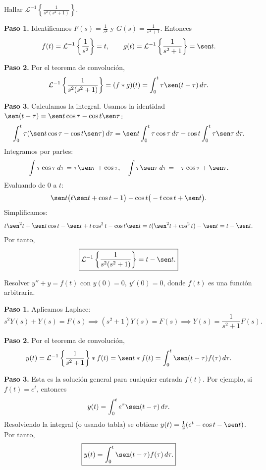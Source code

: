 \begin{example}
Hallar $\mathcal{L}^{-1}\left\{\frac{1}{s^2(s^2+1)}\right\}$.
\begin{myproof}
\textbf{Paso 1.} Identificamos $F(s)=\frac{1}{s^2}$ y $G(s)=\frac{1}{s^2+1}$. Entonces
\[
f(t)=\mathcal{L}^{-1}\left\{\frac{1}{s^2}\right\}=t,\qquad g(t)=\mathcal{L}^{-1}\left\{\frac{1}{s^2+1}\right\}=\sen t.
\]

\textbf{Paso 2.} Por el teorema de convolución,
\[
\mathcal{L}^{-1}\left\{\frac{1}{s^2(s^2+1)}\right\} = (f * g)(t) = \int_0^t \tau \sen(t-\tau)\,d\tau.
\]

\textbf{Paso 3.} Calculamos la integral. Usamos la identidad $\sen(t-\tau)=\sen t\cos\tau - \cos t\sen\tau$:
\[
\int_0^t \tau (\sen t\cos\tau - \cos t\sen\tau)\,d\tau
= \sen t\int_0^t \tau\cos\tau\,d\tau - \cos t\int_0^t \tau\sen\tau\,d\tau.
\]
Integramos por partes:
\[
\int \tau\cos\tau\,d\tau = \tau\sen\tau + \cos\tau,\quad
\int \tau\sen\tau\,d\tau = -\tau\cos\tau + \sen\tau.
\]
Evaluando de $0$ a $t$:
\[
\sen t\big( t\sen t + \cos t - 1 \big) - \cos t\big( -t\cos t + \sen t \big).
\]
Simplificamos:
\[
t\sen^2 t + \sen t\cos t - \sen t + t\cos^2 t - \cos t\sen t = t(\sen^2 t+\cos^2 t) - \sen t = t - \sen t.
\]
Por tanto,
\[
\boxed{\mathcal{L}^{-1}\left\{\frac{1}{s^2(s^2+1)}\right\} = t - \sen t.}
\]
\end{myproof}
\end{example}

\begin{example}
Resolver $y'' + y = f(t)$ con $y(0)=0,\ y'(0)=0$, donde $f(t)$ es una función arbitraria.
\begin{myproof}
\textbf{Paso 1.} Aplicamos Laplace:
\[
s^2Y(s) + Y(s) = F(s) \implies (s^2+1)Y(s)=F(s) \implies Y(s)=\frac{1}{s^2+1}F(s).
\]

\textbf{Paso 2.} Por el teorema de convolución,
\[
y(t) = \mathcal{L}^{-1}\left\{\frac{1}{s^2+1}\right\} * f(t) = \sen t * f(t) = \int_0^t \sen(t-\tau) f(\tau)\,d\tau.
\]

\textbf{Paso 3.} Esta es la solución general para cualquier entrada $f(t)$. Por ejemplo, si $f(t)=e^{t}$, entonces
\[
y(t)=\int_0^t e^{\tau}\sen(t-\tau)\,d\tau.
\]
Resolviendo la integral (o usando tabla) se obtiene $y(t)=\frac{1}{2}(e^{t}-\cos t-\sen t)$.
Por tanto,
\[
\boxed{y(t)=\int_0^t \sen(t-\tau) f(\tau)\,d\tau.}
\]
\end{myproof}
\end{example}

